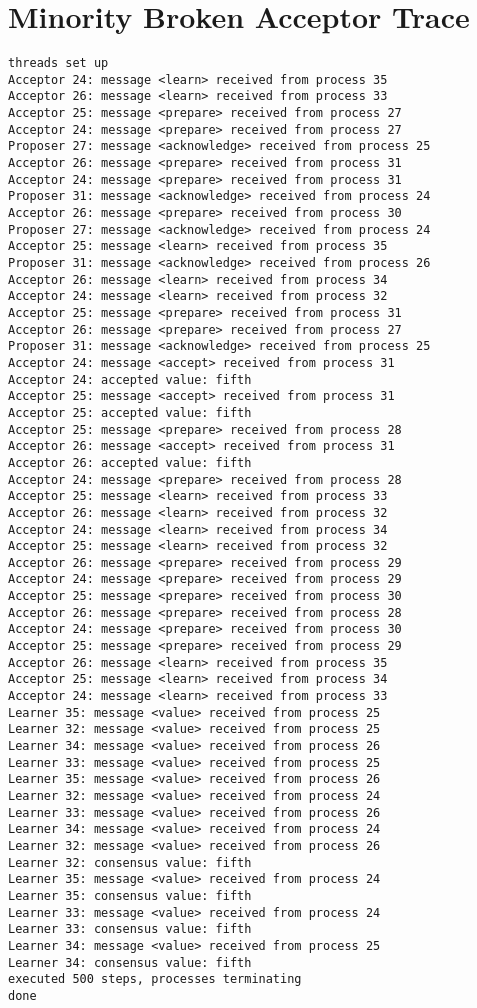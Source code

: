 \documentclass[a4paper, 12pt]{article}
\begin{document}
\section{Minority Broken Acceptor Trace}\label{app:minorityAcceptorFailure:2}

\begin{lstlisting}
threads set up
Acceptor 24: message <learn> received from process 35
Acceptor 26: message <learn> received from process 33
Acceptor 25: message <prepare> received from process 27
Acceptor 24: message <prepare> received from process 27
Proposer 27: message <acknowledge> received from process 25
Acceptor 26: message <prepare> received from process 31
Acceptor 24: message <prepare> received from process 31
Proposer 31: message <acknowledge> received from process 24
Acceptor 26: message <prepare> received from process 30
Proposer 27: message <acknowledge> received from process 24
Acceptor 25: message <learn> received from process 35
Proposer 31: message <acknowledge> received from process 26
Acceptor 26: message <learn> received from process 34
Acceptor 24: message <learn> received from process 32
Acceptor 25: message <prepare> received from process 31
Acceptor 26: message <prepare> received from process 27
Proposer 31: message <acknowledge> received from process 25
Acceptor 24: message <accept> received from process 31
Acceptor 24: accepted value: fifth
Acceptor 25: message <accept> received from process 31
Acceptor 25: accepted value: fifth
Acceptor 25: message <prepare> received from process 28
Acceptor 26: message <accept> received from process 31
Acceptor 26: accepted value: fifth
Acceptor 24: message <prepare> received from process 28
Acceptor 25: message <learn> received from process 33
Acceptor 26: message <learn> received from process 32
Acceptor 24: message <learn> received from process 34
Acceptor 25: message <learn> received from process 32
Acceptor 26: message <prepare> received from process 29
Acceptor 24: message <prepare> received from process 29
Acceptor 25: message <prepare> received from process 30
Acceptor 26: message <prepare> received from process 28
Acceptor 24: message <prepare> received from process 30
Acceptor 25: message <prepare> received from process 29
Acceptor 26: message <learn> received from process 35
Acceptor 25: message <learn> received from process 34
Acceptor 24: message <learn> received from process 33
Learner 35: message <value> received from process 25
Learner 32: message <value> received from process 25
Learner 34: message <value> received from process 26
Learner 33: message <value> received from process 25
Learner 35: message <value> received from process 26
Learner 32: message <value> received from process 24
Learner 33: message <value> received from process 26
Learner 34: message <value> received from process 24
Learner 32: message <value> received from process 26
Learner 32: consensus value: fifth
Learner 35: message <value> received from process 24
Learner 35: consensus value: fifth
Learner 33: message <value> received from process 24
Learner 33: consensus value: fifth
Learner 34: message <value> received from process 25
Learner 34: consensus value: fifth
executed 500 steps, processes terminating
done
\end{lstlisting}
\end{document}
